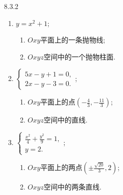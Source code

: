 \begin{exercise}{8.3.2}
\begin{enumerate}
        \item $y=x^2+1$;
        \begin{solution}
            \begin{multicols}{2}
            \begin{enumerate}
                \item $Oxy$平面上的一条抛物线;
                \item $Oxyz$空间中的一个抛物柱面.
            \end{enumerate}
            \end{multicols}
        \end{solution}

        \item $\begin{cases}
            5x-y+1=0,\\
            2x-y-3=0.
        \end{cases}$;
        \begin{solution}
            \begin{multicols}{2}
            \begin{enumerate}
                \item $Oxy$平面上的点$(-\frac{4}{3},-\frac{11}{3})$;
                \item $Oxyz$空间中的直线.
            \end{enumerate}
            \end{multicols}
        \end{solution}

        \item $\begin{cases}
            \frac{x^2}{4}+\frac{y^2}{9}=1,\\
            y=2.
        \end{cases}$;
        \begin{solution}
            \begin{multicols}{2}
            \begin{enumerate}
                \item $Oxy$平面上的两点$(\pm\frac{\sqrt{20}}{3},2)$;
                \item $Oxyz$空间中的两条直线.
            \end{enumerate}
            \end{multicols}
        \end{solution}


\end{enumerate}
\end{exercise}

